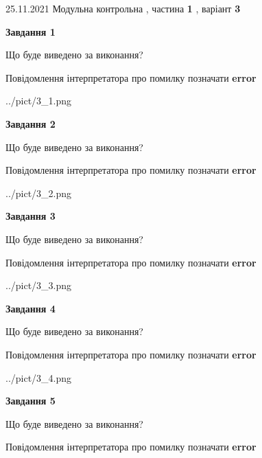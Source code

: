 \documentclass[10pt, ukrainian]{article}
\begin{document}
{25.11.2021 Модульна контрольна , частина \textbf { 1 }, варіант  \No \textbf { 3 }\par}
{
\begin {large}

{\begin {center}\textbf{Завдання 1}\end {center}}\par
Що буде виведено за виконання? \par
Повідомлення інтерпретатора про помилку позначати \textbf{error}

\begin{center}
	{../pict/3_1.png}
\end{center}
\newpage

{\begin {center}\textbf{Завдання 2}\end {center}}\par
Що буде виведено за виконання? \par
Повідомлення інтерпретатора про помилку позначати \textbf{error}

\begin{center}
	{../pict/3_2.png}
\end{center}
\newpage

{\begin {center}\textbf{Завдання 3}\end {center}}\par
Що буде виведено за виконання? \par
Повідомлення інтерпретатора про помилку позначати \textbf{error}

\begin{center}
	{../pict/3_3.png}
\end{center}
\newpage

{\begin {center}\textbf{Завдання 4}\end {center}}\par
Що буде виведено за виконання? \par
Повідомлення інтерпретатора про помилку позначати \textbf{error}

\begin{center}
	{../pict/3_4.png}
\end{center}
\newpage

{\begin {center}\textbf{Завдання 5}\end {center}}\par
Що буде виведено за виконання? \par
Повідомлення інтерпретатора про помилку позначати \textbf{error}


\end{large}}
\end{document}
